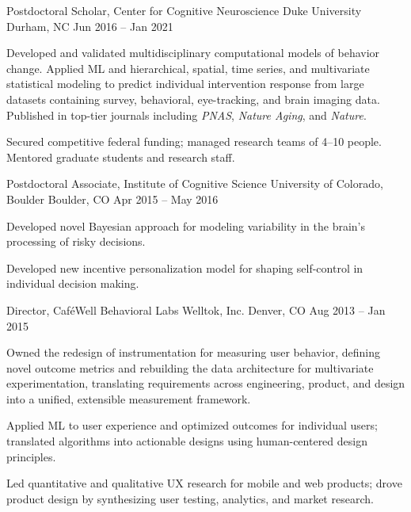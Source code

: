 \documentclass[11pt, letterpaper]{awesome-cv-resume}
\begin{document}
\begin{cventries}
  \vspace{2mm}
  \cventry
    {Postdoctoral Scholar, Center for Cognitive Neuroscience}
    {Duke University}
    {Durham, NC}
    {Jun 2016 -- Jan 2021}
    {
      \begin{cvitems}
        \item Developed and validated multidisciplinary computational models of behavior change. Applied ML and hierarchical, spatial, time series, and multivariate statistical modeling to predict individual intervention response from large datasets containing survey, behavioral, eye-tracking, and brain imaging data. Published in top-tier journals including \textit{PNAS}, \textit{Nature Aging}, and \textit{Nature}.
        \item Secured competitive federal funding; managed research teams of 4--10 people. Mentored graduate students and research staff. 
      \end{cvitems}
    }

  \vspace{2mm}
  \cventry
    {Postdoctoral Associate, Institute of Cognitive Science}
    {University of Colorado, Boulder}
    {Boulder, CO}
    {Apr 2015 -- May 2016}
    {
      \begin{cvitems}
        \item Developed novel Bayesian approach for modeling variability in the brain’s processing of risky decisions. 
        \item Developed new incentive personalization model for shaping self-control in individual decision making.
      \end{cvitems}
    }

  \vspace{2mm}
  \cventry
    {Director, CaféWell Behavioral Labs}
    {Welltok, Inc.}
    {Denver, CO}
    {Aug 2013 -- Jan 2015}
    {
      \begin{cvitems}
        \item Owned the redesign of instrumentation for measuring user behavior, defining novel outcome metrics and rebuilding the data architecture for multivariate experimentation, translating requirements across engineering, product, and design into a unified, extensible measurement framework.
        \item Applied ML to user experience and optimized outcomes for individual users; translated algorithms into actionable designs using human-centered design principles.
        \item Led quantitative and qualitative UX research for mobile and web products; drove product design by synthesizing user testing, analytics, and market research.
      \end{cvitems}
    }

\end{cventries}
\end{document}
